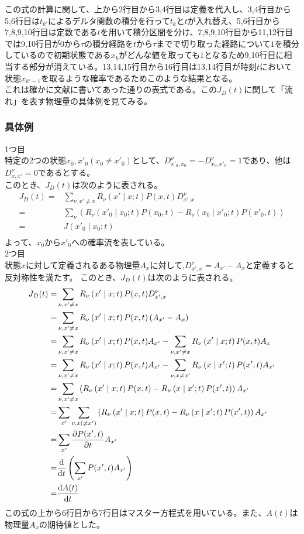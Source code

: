 \documentclass{ltjsarticle}
\begin{document}
この式の計算に関して、上から2行目から3,4行目は定義を代入し、3,4行目から5,6行目は$t_{k'}$によるデルタ関数の積分を行って$t_k$と$t$が入れ替え、5,6行目から7,8,9,10行目は定数である$t$を用いて積分区間を分け、7,8,9,10行目から11,12行目では9,10行目が$0$から$\tau$の積分経路を$t$から$\tau$までで切り取った経路について$1$を積分しているので初期状態である$x_k$がどんな値を取っても$1$となるため9,10行目に相当する部分が消えている。13,14,15行目から16行目は13,14行目が時刻$t$において状態$x_{k'-1}$を取るような確率であるためこのような結果となる。\\
これは確かに文献に書いてあった通りの表式である。この$J_D(t)$に関して「流れ」を表す物理量の具体例を見てみる。
\subsubsection{具体例}
1つ目\\
特定の2つの状態$x_0,x'_0(x_0\neq x'_0)$として、$D^{\nu}_{x'_0,x_0}=-D^{\nu}_{x_0,x'_0}=1$であり、他は$D^{\nu}_{x,x'}=0$であるとする。\\
このとき、$J_D(t)$は次のように表される。
\begin{align}
  J_D(t)=&\sum_{\nu,x'\neq x}R_{\nu}\left(x'\mid x;t\right)P(x,t)D^{\nu}_{x',x}\\
  =&\sum_\nu\left( R_{\nu}\left(x'_0\mid x_0;t\right)P(x_0,t)-R_{\nu}\left(x_0\mid x'_0;t\right)P(x'_0,t) \right)\\
  =&J(x'_0\mid x_0;t)\\
\end{align}
よって、$x_0$から$x'_0$への確率流を表している。\\
2つ目\\
状態$x$に対して定義されるある物理量$A_x$に対して,$D^\nu_{x',x}=A_{x'}-A_x$と定義すると反対称性を満たす。
このとき、$J_D(t)$は次のように表される。
\begin{align}
  J_D(t)=&\sum_{\nu,x'\neq x}R_{\nu}\left(x'\mid x;t\right)P(x,t)D^{\nu}_{x',x}\\
  =&\sum_{\nu,x'\neq x}R_{\nu}\left(x'\mid x;t\right)P(x,t)\left( A_{x'}-A_x \right) \\
  =&\sum_{\nu,x'\neq x}R_{\nu}\left(x'\mid x;t\right)P(x,t)A_{x'}-\sum_{\nu,x'\neq x}R_{\nu}\left(x'\mid x;t\right)P(x,t)A_x \\
  =&\sum_{\nu,x'\neq x}R_{\nu}\left(x'\mid x;t\right)P(x,t)A_{x'}-\sum_{\nu,x\neq x'}R_{\nu}\left(x\mid x';t\right)P(x',t)A_{x'} \\
  =&\sum_{\nu,x'\neq x}\left( R_{\nu}\left(x'\mid x;t\right)P(x,t)- R_{\nu}\left(x\mid x';t\right)P(x',t)\right) A_{x'}\\
  =&\sum_{x'}\sum_{\nu,x(\neq x')}\left( R_{\nu}\left(x'\mid x;t\right)P(x,t)- R_{\nu}\left(x\mid x';t\right)P(x',t)\right) A_{x'}\\
  =&\sum_{x'}\pdv{P(x',t)}{t}A_{x'}\\
  =&\dv{t}\left( \sum_{x'}P(x',t)A_{x'} \right) \\
  =&\dv{A(t)}{t}
\end{align}
この式の上から6行目から7行目はマスター方程式を用いている。また、$A(t)$は物理量$A_x$の期待値とした。\\
\end{document}
